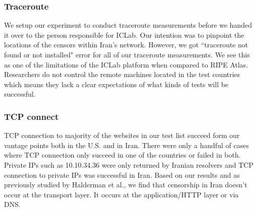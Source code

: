 \subsubsection{Traceroute} We setup our experiment to conduct traceroute measurements before we handed it over to the person responsible for ICLab. Our intention was to pinpoint the locations of the censors within Iran’s network. However, we got ``traceroute not found or not installed" error for all of our traceroute measurements. We see this as one of the limitations of the ICLab platform when compared to RIPE Atlas. Researchers do not control the remote machines located in the test countries which means they lack a clear expectations of what kinds of tests will be successful. \\
\subsubsection{TCP connect} 
TCP connection to majority of the websites in our test list succeed form our vantage points both in the U.S. and in Iran. There were only a handful of cases where TCP connection only succeed in one of the countries or failed in both. Private IPs such as 10.10.34.36 were only returned by Iranian resolvers and TCP connection to private IPs was successful in Iran. Based on our results and as previously studied by Halderman et al., we find that censorship in Iran doesn't occur at the transport layer. It occurs at the application/HTTP layer or via DNS.
